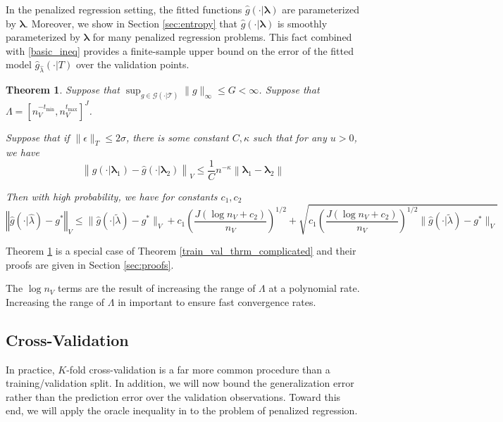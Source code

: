\documentclass[12pt]{article}
\newtheorem{theorem}{Theorem}
\begin{document}
In the penalized regression setting, the fitted functions $\hat{g}(\cdot | \boldsymbol \lambda)$ are parameterized by $\boldsymbol \lambda$. Moreover, we show in Section \ref{sec:entropy} that $\hat{g}(\cdot | \boldsymbol \lambda)$ is smoothly parameterized by $\boldsymbol \lambda$ for many penalized regression problems. This fact combined with \eqref{basic_ineq} provides a finite-sample upper bound on the error of the fitted model $\hat{g}_{\hat \lambda}(\cdot | T)$ over the validation points.

\begin{theorem}
\label{train_val_thrm}
Suppose that $\sup_{g \in \mathcal{G(\cdot | T)}} \| g \|_\infty \le G < \infty$.
Suppose that $\Lambda = [ n_V^{-t_{\min}}, n_V^{t_{\max}} ]^J $.

Suppose that if $\| \epsilon \|_T \le 2 \sigma $, there is some constant $C, \kappa$ such that for any $u> 0$, we have
\begin{equation}
\left \| \hat{g}(\cdot | \boldsymbol \lambda_1) - \hat{g}(\cdot | \boldsymbol \lambda_2) \right \|_V 
\le 
\frac{1}{C} n^{-\kappa} \left \| \boldsymbol \lambda_1 - \boldsymbol \lambda_2 \right \|
\end{equation}

Then with high probability, we have for constants $c_1, c_2$
\begin{equation}
\label{error_bound}
\left\Vert \hat{g}(\cdot | \hat{\lambda}) -g^{*}\right\Vert _{V} 
\le
\|\hat{g}(\cdot | \tilde{\lambda} ) -g^{*}\|_{V}
+c_{1} \left (\frac{J(\log n_{V}+c_{2})}{n_{V}} \right )^{1/2}
+\sqrt{ c_{1} \left (\frac{J(\log n_{V}+c_{2})}{n_{V}} \right )^{1/2} \|\hat{g}(\cdot | \tilde{\lambda} ) -g^{*}\|_{V}}
\end{equation}
\end{theorem}
Theorem \ref{train_val_thrm} is a special case of Theorem \ref{train_val_thrm_complicated} and their proofs are given in Section \ref{sec:proofs}.

The $\log n_V$ terms are the result of increasing the range of $\Lambda$ at a polynomial rate. Increasing the range of $\Lambda$ in important to ensure fast convergence rates.



\subsection{Cross-Validation}

In practice, $K$-fold cross-validation is a far more common procedure than a training/validation split. In addition, we will now bound the generalization error rather than the prediction error over the validation observations. Toward this end, we will apply the oracle inequality in \citet{lecue2012oracle} to the problem of penalized regression.
\end{document}
